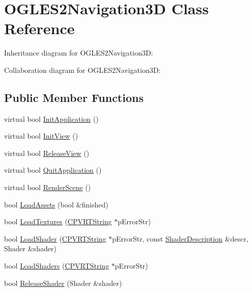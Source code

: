 \hypertarget{class_o_g_l_e_s2_navigation3_d}{\section{O\+G\+L\+E\+S2\+Navigation3\+D Class Reference}
\label{class_o_g_l_e_s2_navigation3_d}
}


Inheritance diagram for O\+G\+L\+E\+S2\+Navigation3\+D\+:


Collaboration diagram for O\+G\+L\+E\+S2\+Navigation3\+D\+:
\subsection*{Public Member Functions}
\begin{DoxyCompactItemize}
\item 
virtual bool \hyperlink{class_o_g_l_e_s2_navigation3_d_a3ebe1153920f498bae64a995c38c7cdd}{Init\+Application} ()
\item 
virtual bool \hyperlink{class_o_g_l_e_s2_navigation3_d_a609cead917ddb0f0fd12878fbc129fa7}{Init\+View} ()
\item 
virtual bool \hyperlink{class_o_g_l_e_s2_navigation3_d_a084c0e3372c74535827fc20ba1a39a39}{Release\+View} ()
\item 
virtual bool \hyperlink{class_o_g_l_e_s2_navigation3_d_aa16d07ae5e64b996f29fce58777a2a98}{Quit\+Application} ()
\item 
virtual bool \hyperlink{class_o_g_l_e_s2_navigation3_d_ac5ad07593faf0e16244b602626d2be3c}{Render\+Scene} ()
\item 
bool \hyperlink{class_o_g_l_e_s2_navigation3_d_a44021b8be24e6c6a2e1b5a1a8394fe8e}{Load\+Assets} (bool \&finished)
\item 
bool \hyperlink{class_o_g_l_e_s2_navigation3_d_ab3de1f3bc50a300eb17781f73a6b7628}{Load\+Textures} (\hyperlink{class_c_p_v_r_t_string}{C\+P\+V\+R\+T\+String} $\ast$p\+Error\+Str)
\item 
bool \hyperlink{class_o_g_l_e_s2_navigation3_d_a74010a6172519bfce746fe66a0165167}{Load\+Shader} (\hyperlink{class_c_p_v_r_t_string}{C\+P\+V\+R\+T\+String} $\ast$p\+Error\+Str, const \hyperlink{struct_shader_description}{Shader\+Description} \&descr, Shader \&shader)
\item 
bool \hyperlink{class_o_g_l_e_s2_navigation3_d_ae9b0517a0e301642740b9c7abbbf3913}{Load\+Shaders} (\hyperlink{class_c_p_v_r_t_string}{C\+P\+V\+R\+T\+String} $\ast$p\+Error\+Str)
\item 
bool \hyperlink{class_o_g_l_e_s2_navigation3_d_abc4c7b8a89bf2c48ae1cbbbeecb256f8}{Release\+Shader} (Shader \&shader)

\end{DoxyCompactItemize}
